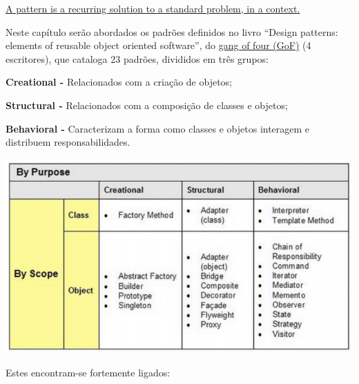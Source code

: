 \documentclass{article}
\begin{document}
\pagebreak

\uline{A pattern is a recurring solution to a standard problem, in a context.}

\vspace{2mm}
Neste capítulo serão abordados os padrões definidos no livro “Design patterns:
elements of reusable object oriented software”, do \uline{gang of four (GoF)} (4 escritores), que
cataloga 23 padrões, divididos em três grupos:

\begin{flushleft}
    \textbf{Creational -} Relacionados com a criação de objetos;

    \textbf{Structural -} Relacionados com a composição de classes e objetos;

    \textbf{Behavioral -} Caracterizam a forma como classes e objetos interagem e
    distribuem responsabilidades.
\end{flushleft}

\begin{center}
    \includegraphics[scale=0.4]{Images/22.png}
\end{center}

Estes encontram-se fortemente ligados:
\end{document}
